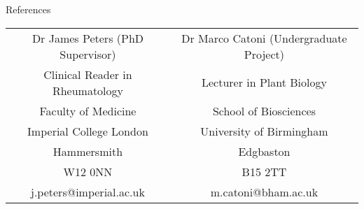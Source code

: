 \documentclass{resume}
\begin{document}
\begin{rSection}{References}

\begin{center}
\begin{tabular}{c@{\hskip 0.75in}c} 

 Dr James Peters (PhD Supervisor) & Dr Marco Catoni (Undergraduate Project) \\ 
 Clinical Reader in Rheumatology & Lecturer in Plant Biology \\ 
 Faculty of Medicine & School of Biosciences \\ 
 Imperial College London & University of Birmingham \\ 
 Hammersmith & Edgbaston \\ 
 W12 0NN & B15 2TT \\ 
 j.peters@imperial.ac.uk & m.catoni@bham.ac.uk \\ 
\end{tabular}
\end{center}

\end{rSection}
\end{document}
